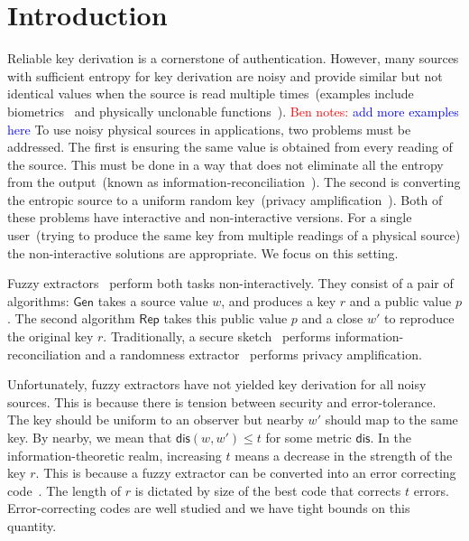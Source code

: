 \documentclass[11pt]{article}
\newcommand{\class}[1]{{\ensuremath{\mathsf{#1}}}}
\newcommand{\gen}{\ensuremath{\class{Gen}}\xspace}
\newcommand{\rep}{\ensuremath{\class{Rep}}\xspace}
\newcommand{\dis}{\ensuremath{\mathsf{dis}}}
\newcommand{\authnote}[2]{{\textcolor{red}{\textsf{#1 notes: }\textcolor{blue}{ #2}}\marginpar{\textcolor{red}{\textbf{!!!!!}}}}}
\newcommand{\authnote}[2]{}
\newcommand{\bnote}[1]{{\authnote{Ben}{#1}}}
\begin{document}
\section{Introduction}\label{sec:introduction}
Reliable key derivation is a cornerstone of authentication.  However, many sources with sufficient entropy for key derivation are noisy and provide similar but not identical values when the source is read multiple times~(examples include biometrics~\cite{daugman2004} and physically unclonable functions~\cite{pappu2002physical}). \bnote{add more examples here} To use noisy physical sources in applications, two problems must be addressed.  The first is ensuring the same value is obtained from every reading of the source.  This must be done in a way that does not eliminate all the entropy from the output~(known as information-reconciliation~\cite{bennett1988privacy}).  The second is converting the entropic source to a uniform random key~(privacy amplification~\cite{bennett1988privacy}).  Both of these problems have interactive and non-interactive versions.  For a single user~(trying to produce the same key from multiple readings of a physical source) the non-interactive solutions are appropriate.  We focus on this setting.  %

Fuzzy extractors~\cite{DBLP:journals/siamcomp/DodisORS08} perform both tasks non-interactively.  They consist of a pair of algorithms: \gen takes a source value $w$, and produces a key $r$ and a public value $p$.  The second algorithm \rep takes this public value $p$ and a close $w'$ to reproduce the original key $r$.  Traditionally, a secure sketch~\cite{DBLP:journals/siamcomp/DodisORS08} performs information-reconciliation and a randomness extractor~\cite{nisan1993randomness} performs privacy amplification.

Unfortunately, fuzzy extractors have not yielded key derivation for all noisy sources.  
This is because there is tension between security and error-tolerance.  The key should be uniform to an observer but nearby $w'$ should map to the same key.  By nearby, we mean that $\dis(w, w')\leq t$ for some metric $\dis$.  In the information-theoretic realm, increasing $t$ means a decrease in the strength of the key $r$.  This is because a fuzzy extractor can be converted into an error correcting code~\cite[Appendix C]{DBLP:journals/siamcomp/DodisORS08}.  The length of $r$ is dictated by size of the best code that corrects $t$ errors.  Error-correcting codes are well studied and we have tight bounds on this quantity. %
\end{document}
